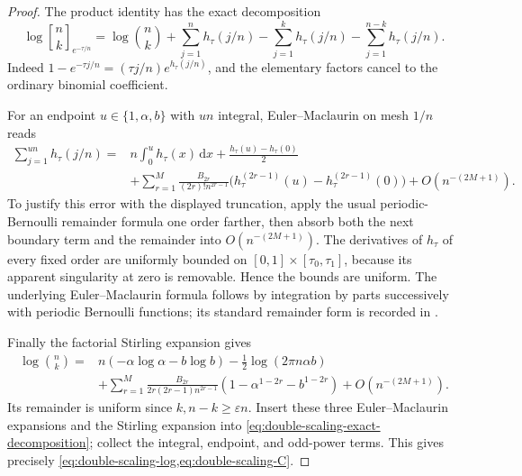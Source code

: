 \documentclass[11pt,a4paper]{article}
\numberwithin{equation}{section}
\theoremstyle{definition}
\theoremstyle{remark}
\newcommand{\Gb}[3]{\genfrac{[}{]}{0pt}{}{#1}{#2}_{#3}}
\newcommand{\dd}{\,\mathrm d}
\begin{document}
\begin{proof}
The product identity has the exact decomposition
\begin{equation}
 \log\Gb nk{e^{-\tau/n}}
  =\log\binom nk+
      \sum_{j=1}^n h_\tau(j/n)
      -\sum_{j=1}^k h_\tau(j/n)
      -\sum_{j=1}^{n-k}h_\tau(j/n).
 \label{eq:double-scaling-exact-decomposition}
\end{equation}
Indeed $1-e^{-\tau j/n}=(\tau j/n)e^{h_\tau(j/n)}$, and the elementary
factors cancel to the ordinary binomial coefficient.

For an endpoint $u\in\{1,\alpha,b\}$ with $un$ integral,
Euler--Maclaurin on mesh $1/n$ reads
\begin{align*}
 \sum_{j=1}^{un}h_\tau(j/n)
 ={}&n\int_0^u h_\tau(x)\dd x+\frac{h_\tau(u)-h_\tau(0)}2\\
 &+\sum_{r=1}^M\frac{B_{2r}}{(2r)!n^{2r-1}}
       \bigl(h_\tau^{(2r-1)}(u)-h_\tau^{(2r-1)}(0)\bigr)
       +O(n^{-(2M+1)}).
\end{align*}
To justify this error with the displayed truncation, apply the usual
periodic-Bernoulli remainder formula one order farther, then absorb
both the next boundary term and the remainder into $O(n^{-(2M+1)})$.
The derivatives of $h_\tau$ of every fixed order are uniformly bounded
on $[0,1]\times[\tau_0,\tau_1]$, because its apparent singularity at
zero is removable. Hence the bounds are uniform. The underlying
Euler--Maclaurin formula follows by integration by parts successively
with periodic Bernoulli functions; its standard remainder form is
recorded in \cite[\S2.10(i)]{dlmfem}.

Finally the factorial Stirling expansion
\cite[\S5.11]{dlmfgamma} gives
\begin{align*}
 \log\binom nk={}&n(-\alpha\log\alpha-b\log b)
                  -\frac12\log(2\pi n\alpha b)\\
 &+\sum_{r=1}^M\frac{B_{2r}}{2r(2r-1)n^{2r-1}}
       (1-\alpha^{1-2r}-b^{1-2r})+O(n^{-(2M+1)}).
\end{align*}
Its remainder is uniform since $k,n-k\ge\varepsilon n$.
Insert these three Euler--Maclaurin expansions and the Stirling
expansion into \cref{eq:double-scaling-exact-decomposition}; collect
the integral, endpoint, and odd-power terms. This gives precisely
\cref{eq:double-scaling-log,eq:double-scaling-C}.
\end{proof}
\end{document}
